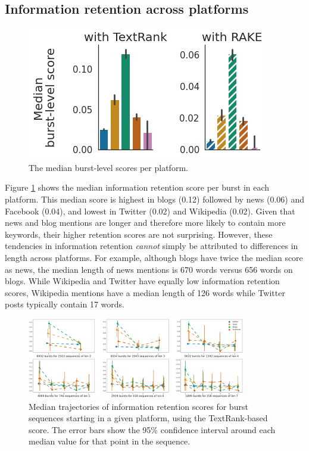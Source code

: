 \documentclass[letterpaper]{article} %
\begin{document}
\subsection{Information retention across platforms}

\begin{figure}[t]
\centering
\includegraphics[width=0.9\columnwidth]{figs/median_scores_platforms.png}
\caption{The median burst-level scores per platform.}
\label{fig:burst_medianscore_platform}
\end{figure}

Figure \ref{fig:burst_medianscore_platform} shows the median information retention score per burst in each platform. This median score is highest in blogs (0.12) followed by news (0.06) and Facebook (0.04), and lowest in Twitter (0.02) and Wikipedia (0.02). Given that news and blog mentions are longer and therefore more likely to contain more keywords, their higher retention scores are not surprising. However, these tendencies in information retention \emph{cannot} simply be attributed to differences in length across platforms. For example, although blogs have twice the median score as news, the median length of news mentions is 670 words versus 656 words on blogs. While Wikipedia and Twitter have equally low information retention scores, Wikipedia mentions have a median length of 126 words while Twitter posts typically contain 17 words.

\begin{figure}[t]
\centering
\includegraphics[width=0.85\textwidth]{figs/trajectory_platform.png}
\caption{Median trajectories of information retention scores for burst sequences starting in a given platform, using the TextRank-based score. The error bars show the 95\% confidence interval around each median value for that point in the sequence.}
\label{fig:sequences2_9_first}
\end{figure}
\end{document}

